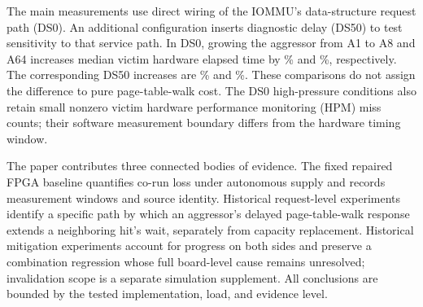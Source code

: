 The main measurements use direct wiring of the IOMMU's data-structure request path (DS0). An additional configuration inserts diagnostic delay (DS50) to test sensitivity to that service path. In DS0, growing the aggressor from A1 to A8 and A64 increases median victim hardware elapsed time by \DSZeroAEightElapsedExtra\% and \DSZeroASixtyFourElapsedExtra\%, respectively. The corresponding DS50 increases are \DSFiftyAEightElapsedExtra\% and \DSFiftyASixtyFourElapsedExtra\%. These comparisons do not assign the difference to pure page-table-walk cost. The DS0 high-pressure conditions also retain small nonzero victim hardware performance monitoring (HPM) miss counts; their software measurement boundary differs from the hardware timing window.

The paper contributes three connected bodies of evidence. The fixed repaired FPGA baseline quantifies co-run loss under autonomous supply and records measurement windows and source identity. Historical request-level experiments identify a specific path by which an aggressor's delayed page-table-walk response extends a neighboring hit's wait, separately from capacity replacement. Historical mitigation experiments account for progress on both sides and preserve a combination regression whose full board-level cause remains unresolved; invalidation scope is a separate simulation supplement. All conclusions are bounded by the tested implementation, load, and evidence level.
